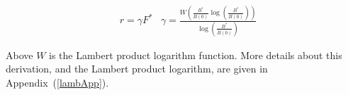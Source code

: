 \documentclass[12pt]{article}
\begin{document}
%
%
%
%

%
\begin{align}
&r = \gamma F^*
&\gamma = \frac{W\left(\frac{B^*}{\bar B(0)}\log\left(\frac{B^*}{\bar B(0)}\right)\right)}{\log\left(\frac{B^*}{\bar B(0)}\right)} \label{gammaOfB}
\end{align}

%
Above $W$ is the Lambert product logarithm function. 
More details about this derivation, and the Lambert product logarithm, are given in \mbox{Appendix (\ref{lambApp}).}
\end{document}
